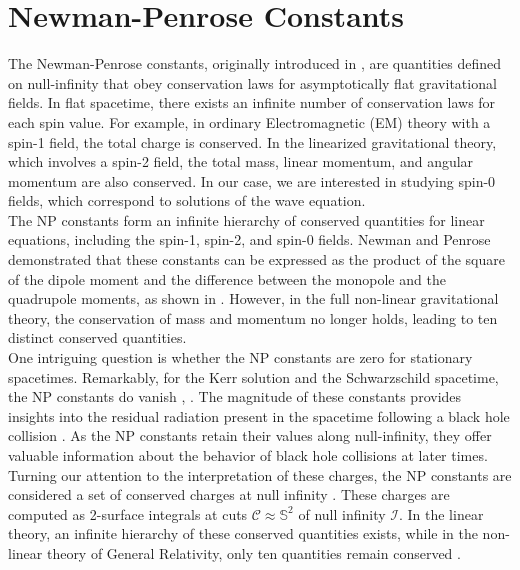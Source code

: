 \section{Newman-Penrose Constants}
\label{section:Newman-Penrose Constants}
The Newman-Penrose constants, originally introduced in \cite{NewPen68}, are quantities defined on null-infinity that obey conservation laws for asymptotically flat gravitational fields. In flat spacetime, there exists an infinite number of conservation laws for each spin value. For example, in ordinary Electromagnetic (EM) theory with a spin-1 field, the total charge is conserved. In the linearized gravitational theory, which involves a spin-2 field, the total mass, linear momentum, and angular momentum are also conserved. In our case, we are interested in studying spin-0 fields, which correspond to solutions of the wave equation.
\\
The NP constants form an infinite hierarchy of conserved quantities for linear equations, including the spin-1, spin-2, and spin-0 fields. Newman and Penrose demonstrated that these constants can be expressed as the product of the square of the dipole moment and the difference between the monopole and the quadrupole moments, as shown in \cite{DaiVal02}. However, in the full non-linear gravitational theory, the conservation of mass and momentum no longer holds, leading to ten distinct conserved quantities.
\\
One intriguing question is whether the NP constants are zero for stationary spacetimes. Remarkably, for the Kerr solution and the Schwarzschild spacetime, the NP constants do vanish \cite{Bac10}, \cite{BaiZhoGonXueXiaoLau07}. The magnitude of these constants provides insights into the residual radiation present in the spacetime following a black hole collision \cite{DaiVal02}. As the NP constants retain their values along null-infinity, they offer valuable information about the behavior of black hole collisions at later times.
\\
Turning our attention to the interpretation of these charges, the NP constants are considered a set of conserved charges at null infinity \cite{NewPen68}. These charges are computed as 2-surface integrals at cuts $\mathcal{C} \approx \mathbb{S}^2$ of null infinity $\mathscr{I}$. In the linear theory, an infinite hierarchy of these conserved quantities exists, while in the non-linear theory of General Relativity, only ten quantities remain conserved \cite{NewPen68}.
\\

